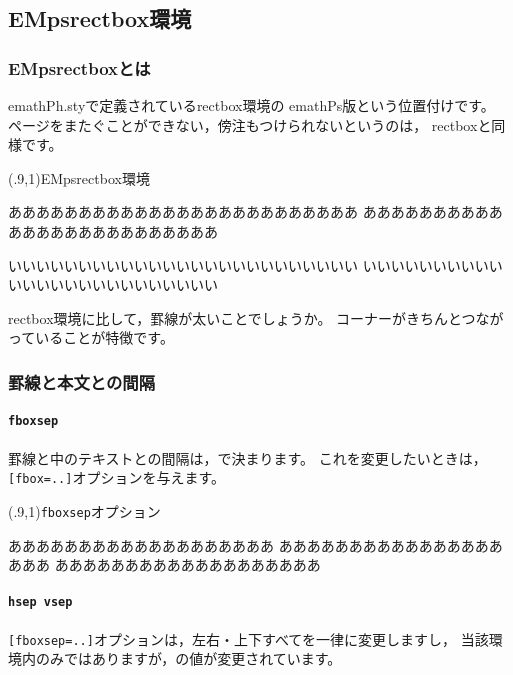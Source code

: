 \documentclass[a4j]{jarticle}
\begin{document}
\subsection{\textsf{EMpsrectbox}環境}
\subsubsection{\textsf{EMpsrectbox}とは}
\textsf{emathPh.sty}で定義されている\textsf{rectbox}環境の
\textsf{emathPs}版という位置付けです。
ページをまたぐことができない，傍注もつけられないというのは，
\textsf{rectbox}と同様です。

\begin{showEx}(.9,1){\textsf{EMpsrectbox}環境}
\begin{EMpsrectbox}
あああああああああああああああああああああああああ
あああああああああああああああああああああああああ

いいいいいいいいいいいいいいいいいいいいいいいいい
いいいいいいいいいいいいいいいいいいいいいいいいい
\end{EMpsrectbox}
\end{showEx}

\textsf{rectbox}環境に比して，罫線が太いことでしょうか。
コーナーがきちんとつながっていることが特徴です。
\pagebreak

\subsubsection{罫線と本文との間隔}
\paragraph{\texttt{fboxsep}}
罫線と中のテキストとの間隔は，で決まります。
これを変更したいときは，\verb+[fbox=..]+オプションを与えます。

\begin{showEx}(.9,1){\texttt{fboxsep}オプション}
\begin{EMpsrectbox}[fboxsep=1zw]
あああああああああああああああああああ
あああああああああああああああああああ
あああああああああああああああああああ
\end{EMpsrectbox}
\end{showEx}

\paragraph{\texttt{hsep vsep}}
\verb+[fboxsep=..]+オプションは，左右・上下すべてを一律に変更しますし，
当該環境内のみではありますが，の値が変更されています。
\end{document}
